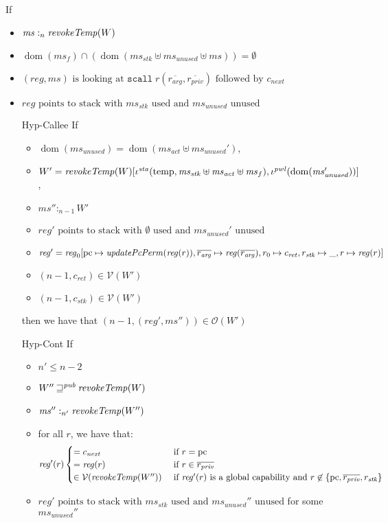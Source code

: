 \documentclass[a4paper]{article}
\DeclareMathOperator{\dom}{dom}
\newcommand{\var}[1]{\mathit{#1}}
\newcommand{\hs}{\var{ms}}
\newcommand{\ms}{\hs}
\newcommand{\pcreg}{\mathrm{pc}}
\newcommand{\reg}{\var{reg}}
\newcommand{\heap}{\var{mem}}
\newcommand{\stk}{\var{stk}}
\newcommand{\pwl}{\var{pwl}}
\newcommand{\sta}{\var{sta}}
\newcommand{\plainfun}[2]{
  \ifthenelse{\equal{#2}{}}
  {\mathit{#1}}
  {\mathit{#1}(#2)}
}
\newcommand{\updatePcPerm}[1]{\plainfun{updatePcPerm}{#1}}
\newcommand{\revokeTemp}[1]{\plainfun{revokeTemp}{#1}}
\newcommand{\futurewk}{\mathbin{\sqsupseteq}^{\var{pub}}}
\newcommand{\heapSat}[3][\heap]{#1 :_{#2} #3}
\newcommand{\memSat}[3][n]{\heapSat[#2]{#1}{#3}}
\newcommand{\asmType}{\plaindom{AsmType}}
\newcommand{\plaindom}[1]{\mathrm{#1}}
\newcommand{\intr}[2]{\mathcal{#1}}
\newcommand{\valueintr}[1]{\intr{V}{#1}}
\newcommand{\stdvr}{\valueintr{\asmType}}
\newcommand{\observations}{\mathcal{O}}
\newcommand{\npair}[2][n]{\left(#1,#2 \right)}
\newcommand{\plainview}[1]{\mathrm{#1}}
\newcommand{\temp}{\plainview{temp}}
\begin{document}
\begin{lemma}
  \label{lem:scall-works}
  If
  \begin{itemize}
  \item $\memSat[n]{\ms}{\revokeTemp{W}}$ 
  \item $\dom(\ms_f) \cap (\dom(\ms_\stk \uplus \ms_{\mathit{unused}} \uplus \ms)) = \emptyset$
  \item $(\reg,\ms) \text{ is looking at }
    \mathtt{scall}\;r(\overline{r_{\mathit{arg}}},
    \overline{r_{\mathit{priv}}}) \text{ followed by } c_{\mathit{next}}$
  \item $\reg \text{ points to stack with $\ms_\stk$ used and $\ms_{\mathit{unused}}$ unused}$
  \item[Hyp-Callee] If
    \begin{itemize}
    \item $\dom(\ms_{\mathit{unused}}) = \dom(\ms_{\mathit{act}}
      \uplus \ms_{\mathit{unused}}')$,
    \item $W' =
      \revokeTemp{W}[\iota^{\sta}(\temp,\ms_\stk\uplus\ms_{\mathit{act}} \uplus \ms_f),\iota^{\pwl}(\dom(\ms_{\mathit{unused}}'))]$,
    \item $\memSat[n-1]{\ms''}{W'}$
    \item $\reg' \text{ points to stack with $\emptyset$ used and $\ms_{\mathit{unused}}'$ unused}$
    \item $\reg'= \reg_0[\pcreg\mapsto\updatePcPerm{\reg(r)},
      \overline{r_{\mathit{arg}}} \mapsto \reg(\overline{r_{\mathit{arg}}}),r_0
      \mapsto c_{\mathit{ret}}, r_\stk \mapsto \_, r \mapsto \reg(r)]$ 
    \item $\npair[n-1]{c_{\mathit{ret}}} \in \stdvr(W')$
    \item $\npair[n-1]{c_\stk} \in \stdvr(W')$
    \end{itemize}

    then we have that $(n-1,(\reg',\ms'')) \in \observations(W')$
  \item[Hyp-Cont] If
    \begin{itemize}
    \item $n' \leq n-2$
    \item $W'' \futurewk \revokeTemp{W}$
    \item $\memSat[n']{\ms''}{\revokeTemp{W''}}$ 
    \item for all $r$, we have that:
      \begin{equation*}
        \reg'(r)
        \begin{cases}
          = c_{\mathit{next}} &\text{ if } r = \pcreg\\
          = \reg(r)&\text{ if } r \in \overline{r_{\mathit{priv}}}\\
          \in \stdvr(\revokeTemp{W''}) &\text{ if $\reg'(r)$ is a global capability and } r \not\in \{\pcreg,\overline{r_{\mathit{priv}}}, r_\stk\}
        \end{cases}
      \end{equation*}
    \item $\reg' \text{ points to stack with $\ms_\stk$ used and $\ms_{\mathit{unused}}''$ unused}$ for some $\ms_{\mathit{unused}}''$
    \end{itemize}


\end{itemize}
\end{lemma}
\end{document}
